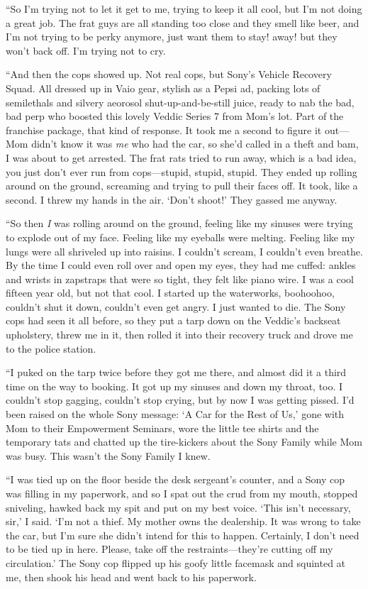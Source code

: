 “So I’m trying not to let it get to me, trying to keep it all cool,
but I’m not doing a great job. The frat guys are all standing too
close and they smell like beer, and I’m not trying to be perky
anymore, just want them to stay! away! but they won’t back off. I’m
trying not to cry.

“And then the cops showed up. Not real cops, but Sony’s Vehicle
Recovery Squad. All dressed up in Vaio gear, stylish as a Pepsi ad,
packing lots of semilethals and silvery aeorosol
shut-up-and-be-still juice, ready to nab the bad, bad perp who
boosted this lovely Veddic Series 7 from Mom’s lot. Part of the
franchise package, that kind of response. It took me a second to
figure it out—Mom didn’t know it was \emph{me} who had the car, so
she’d called in a theft and bam, I was about to get arrested. The
frat rats tried to run away, which is a bad idea, you just don’t
ever run from cops—stupid, stupid, stupid. They ended up rolling
around on the ground, screaming and trying to pull their faces off.
It took, like a second. I threw my hands in the air. ‘Don’t shoot!’
They gassed me anyway.

“So then \emph{I} was rolling around on the ground, feeling like my
sinuses were trying to explode out of my face. Feeling like my
eyeballs were melting. Feeling like my lungs were all shriveled up
into raisins. I couldn’t scream, I couldn’t even breathe. By the
time I could even roll over and open my eyes, they had me cuffed:
ankles and wrists in zapstraps that were so tight, they felt like
piano wire. I was a cool fifteen year old, but not that cool. I
started up the waterworks, boohoohoo, couldn’t shut it down,
couldn’t even get angry. I just wanted to die. The Sony cops had
seen it all before, so they put a tarp down on the Veddic’s
backseat upholstery, threw me in it, then rolled it into their
recovery truck and drove me to the police station.

“I puked on the tarp twice before they got me there, and almost did
it a third time on the way to booking. It got up my sinuses and
down my throat, too. I couldn’t stop gagging, couldn’t stop crying,
but by now I was getting pissed. I’d been raised on the whole Sony
message: ‘A Car for the Rest of Us,’ gone with Mom to their
Empowerment Seminars, wore the little tee shirts and the temporary
tats and chatted up the tire-kickers about the Sony Family while
Mom was busy. This wasn’t the Sony Family I knew.

“I was tied up on the floor beside the desk sergeant’s counter, and
a Sony cop was filling in my paperwork, and so I spat out the crud
from my mouth, stopped sniveling, hawked back my spit and put on my
best voice. ‘This isn’t necessary, sir,’ I said. ‘I’m not a thief.
My mother owns the dealership. It was wrong to take the car, but
I’m sure she didn’t intend for this to happen. Certainly, I don’t
need to be tied up in here. Please, take off the restraints—they’re
cutting off my circulation.’ The Sony cop flipped up his goofy
little facemask and squinted at me, then shook his head and went
back to his paperwork.

